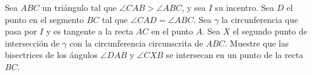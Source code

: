Sea $ABC$ un triángulo tal que $\angle CAB \gt \angle ABC$, y sea $I$ su incentro. Sea $D$ el punto
en el segmento $BC$ tal que $\angle CAD = \angle ABC$. Sea $\gamma$ la circunferencia que pasa por $I$ y es tangente
a la recta $AC$ en el punto $A$. Sea $X$ el segundo punto de intersección de $\gamma$ con la circunferencia
circunscrita de $ABC$. Muestre que las bisectrices de los ángulos $\angle DAB$ y $\angle CXB$ se intersecan en un
punto de la recta $BC$.